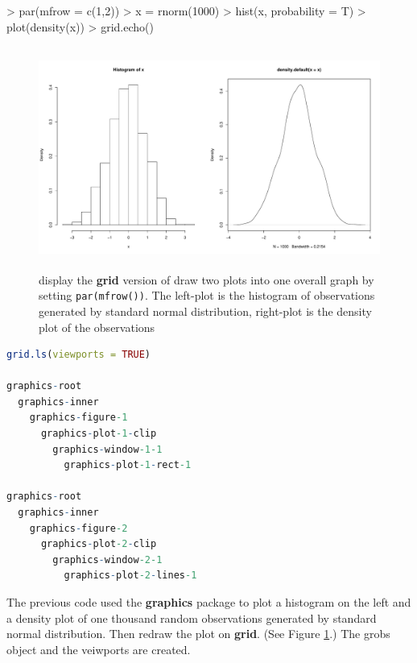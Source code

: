 \documentclass{report}
\begin{document}
\begin{Schunk}
\begin{Sinput}
> par(mfrow = c(1,2))
> x = rnorm(1000)
> hist(x, probability = T)
> plot(density(x))
> grid.echo()
\end{Sinput}
\end{Schunk}
\begin{figure}[!h]
	\begin{center}
		\includegraphics[height = 7.3cm, width = 15cm]{figure/viewport_demo_1.pdf}
		\caption{display the \textbf{grid} version of draw two plots into one overall graph by setting \texttt{par(mfrow())}. The left-plot is the histogram of observations generated by standard normal distribution, right-plot is the density plot of the observations}
		\label{figure_4.1}
	\end{center}
\end{figure}

\newpage
\begin{lstlisting}[language = R]
grid.ls(viewports = TRUE)

graphics-root
  graphics-inner
    graphics-figure-1
      graphics-plot-1-clip
        graphics-window-1-1
          graphics-plot-1-rect-1

graphics-root
  graphics-inner
    graphics-figure-2
      graphics-plot-2-clip
        graphics-window-2-1
          graphics-plot-2-lines-1


\end{lstlisting}
The previous code used the \textbf{graphics} package to plot a histogram on the left and a density plot of one thousand random observations generated by standard normal distribution. Then redraw the plot on \textbf{grid}. (See Figure \ref{figure_4.1}.) The grobs object and the veiwports are created. \\
\end{document}

